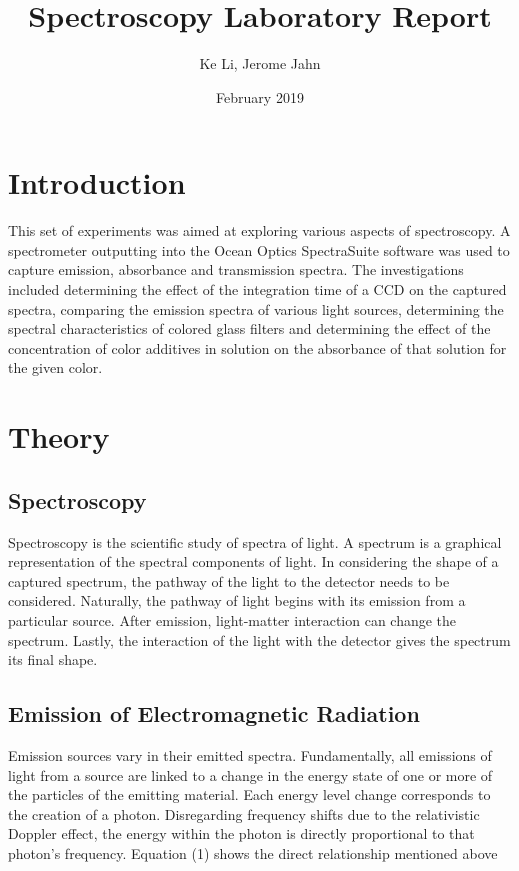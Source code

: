 \documentclass{article}
\title{Spectroscopy Laboratory Report}
\author{Ke Li, Jerome Jahn }
\date{February 2019}
\begin{document}
\maketitle

\tableofcontents
\clearpage

\section{Introduction}
This set of experiments was aimed at exploring various aspects of spectroscopy. A spectrometer outputting into the Ocean Optics SpectraSuite software was used to capture emission, absorbance and transmission spectra. The investigations included determining the effect of the integration time of a CCD on the captured spectra, comparing the emission spectra of various light sources, determining the spectral characteristics of colored glass filters and determining the effect of the concentration of color additives in solution on the absorbance of that solution for the given color.

\section{Theory}
\subsection{Spectroscopy}
Spectroscopy is the scientific study of spectra of light. A spectrum is a graphical representation of the spectral components of light. In considering the shape of a captured spectrum, the pathway of the light to the detector needs to be considered. Naturally, the pathway of light begins with its emission from a particular source. After emission, light-matter interaction can change the spectrum. Lastly, the interaction of the light with the detector gives the spectrum its final shape.  
\subsection{Emission of Electromagnetic Radiation}
Emission sources vary in their emitted spectra. Fundamentally, all emissions of light from a source are linked to a change in the energy state of one or more of the particles of the emitting material. Each energy level change corresponds to the creation of a photon. Disregarding frequency shifts due to the relativistic Doppler effect, the energy within the photon is directly proportional to that photon's frequency. Equation (1) shows the direct relationship mentioned above
\end{document}
